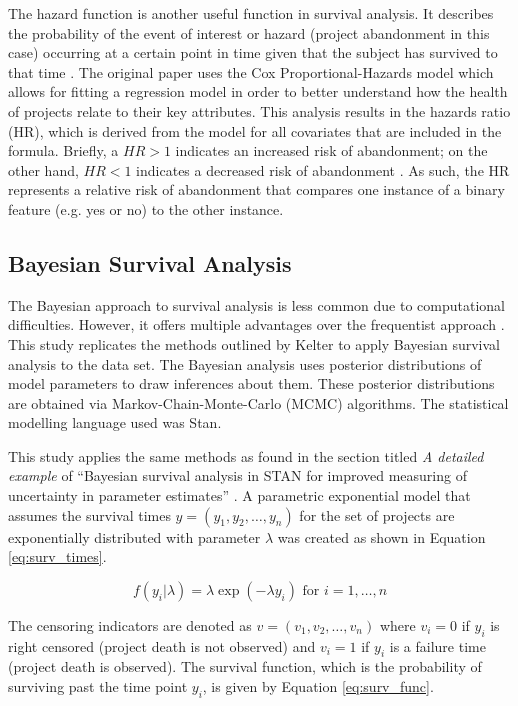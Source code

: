 \documentclass[sigconf]{acmart}
\begin{document}
The hazard function is another useful function in survival analysis. It describes the probability of the event of interest or hazard (project abandonment in this case) occurring at a certain point in time given that the subject has survived to that time \cite{clark2003go}.
The original paper uses the Cox Proportional-Hazards model which allows for fitting a regression model in order to better understand how the health of projects relate to their key attributes. 
This analysis results in the hazards ratio (HR), which is derived from the model for all covariates that are included in the formula. 
Briefly, a $HR > 1$ indicates an increased risk of abandonment; on the other hand, $HR < 1$ indicates a decreased risk of abandonment \cite{cox1972regression}. 
As such, the HR represents a relative risk of abandonment that compares one instance of a binary feature (e.g. yes or no) to the other instance.

\subsection{Bayesian Survival Analysis} \label{bayes_surv_analysis}

The Bayesian approach to survival analysis is less common due to computational difficulties. 
However, it offers multiple advantages over the frequentist approach \cite{kelter2020bayesian}. 
This study replicates the methods outlined by Kelter \cite{kelter2020bayesian} to apply Bayesian survival analysis to the data set.
The Bayesian analysis uses posterior distributions of model parameters to draw inferences about them. 
These posterior distributions are obtained via Markov-Chain-Monte-Carlo (MCMC) algorithms. 
The statistical modelling language used was Stan.

This study applies the same methods as found in the section titled \emph{A detailed example} of ``Bayesian survival analysis in STAN for improved measuring of uncertainty in parameter estimates'' \cite{kelter2020bayesian}. 
A parametric exponential model that assumes the survival times $y = (y_1, y_2, \dots, y_n)$ for the set of projects are exponentially distributed with parameter $\lambda$ was created as shown in Equation \ref{eq:surv_times}.

\begin{equation} \label{eq:surv_times}
    f(y_i|\lambda) = \lambda\exp(- \lambda y_i) \mbox{ for } i=1,\dots,n
\end{equation}

The censoring indicators are denoted as $v = (v_1, v_2,\dots, v_n)$ where $v_i = 0$ if $y_i$ is right censored (project death is not observed) and $v_i = 1$ if $y_i$ is a failure time (project death is observed). The survival function, which is the probability of surviving past the time point $y_i$, is given by Equation \ref{eq:surv_func}.
\end{document}
